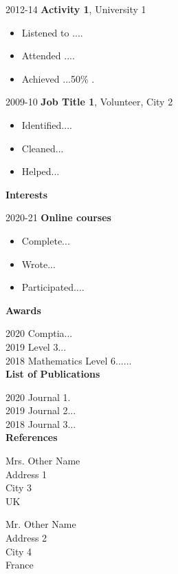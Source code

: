 \documentclass[11pt]{report}
\begin{document}
2012-14 \qquad \textbf{Activity 1}, University 1 \\
\begin{itemize}
	\item Listened to .... 
	\item Attended .... 
	\item Achieved ...50\% . 
	\newline 
\end{itemize}


2009-10 \qquad\textbf{Job Title 1}, Volunteer, City 2 \\
\begin{itemize}
	\item Identified.... 
	\item Cleaned... 
	\item Helped... 
	\newline 
\end{itemize}


\textbf{Interests} 
\newline 

2020-21 \qquad \textbf{Online courses} \\
\begin{itemize}
	\item Complete...
	\item Wrote... 
	\item Participated.... 
	\newline
\end{itemize}


\textbf{Awards} 
\newline 

2020 \space\space\space \qquad Comptia... \\ 
2019 \space\space\space \qquad Level 3... \\ 
2018 \space\space\space \qquad Mathematics Level 6...... \\ 


\textbf{List of Publications} 
\newline 

2020 \space\space\space \qquad Journal 1. \\ 
2019 \space\space\space \qquad Journal 2... \\ 
2018 \space\space\space \qquad Journal 3... \\ 

\textbf{References} 
\newline 

\begin{center}
	\begin{multicols}{2}
		Mrs. Other Name \\
		Address 1 \\
		City 3 \\
		UK \\
		
		\columnbreak
		
		Mr. Other Name \\
		Address 2\\
		City 4 \\
		France
	\end{multicols}
\end{center}
\end{document}
